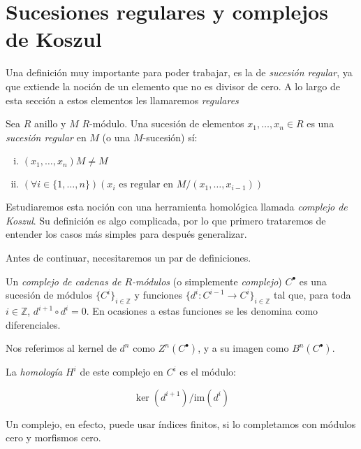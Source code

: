 \section{Sucesiones regulares y complejos de Koszul}

Una definición muy importante para poder trabajar, es la de \emph{sucesión regular}, ya que extiende la noción de un elemento que no es divisor de cero. A lo largo de esta sección a estos elementos les llamaremos \emph{regulares}

\begin{definition}

Sea $R$ anillo y $M$ $R$-módulo. Una sucesión de elementos $x_1,\dots,x_n \in R$ es una \emph{sucesión regular} en $M$ (o una $M$-sucesión) sí:

\begin{enumerate}[i)]
\item $(x_1,\dots,x_n)M \neq M$
\item $(\forall i \in \{1,\dots, n\})(x_i \textrm{ es regular en } M/(x_1,\dots, x_{i-1}))$
\end{enumerate}

\end{definition}

Estudiaremos esta noción con una herramienta homológica llamada \emph{complejo de Koszul}. Su definición es algo complicada, por lo que primero trataremos de entender los casos más simples para después generalizar.

Antes de continuar, necesitaremos un par de definiciones.

\begin{definition}

Un \emph{complejo de cadenas de $R$-módulos} (o simplemente \emph{complejo}) $C^{\bullet}$ es una sucesión de módulos $\{C^i\}_{i \in \mathbb{Z}}$ y funciones $\{d^i: C^{i-1}\rightarrow C^i\}_{i \in \mathbb{Z}}$ tal que, para toda $i \in \mathbb{Z}$, $d^{i+1} \circ d^i = 0$. En ocasiones a estas funciones se les denomina como diferenciales.

Nos referimos al kernel de $d^n$ como $Z^n(C^\bullet)$, y a su imagen como $B^n(C^\bullet)$.

La \emph{homología} $H^i$ de este complejo en $C^i$ es el módulo:

$$ \ker(d^{i+1})/\textrm{im}(d^{i})$$

\end{definition}

Un complejo, en efecto, puede usar índices finitos, si lo completamos con módulos cero y morfismos cero.


